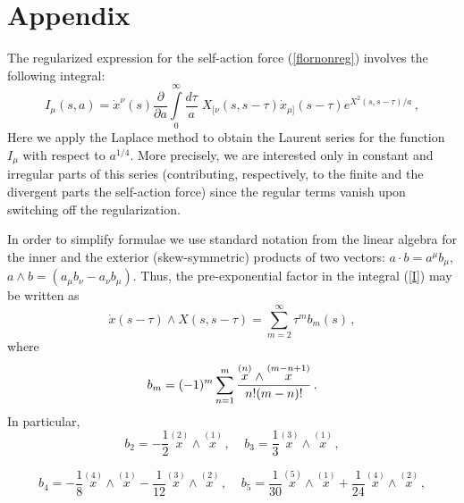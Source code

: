 \documentclass[a4paper,12pt]{article}
\begin{document}
\section*{Appendix}

The regularized expression for the self-action force
(\ref{flornonreg}) involves the following integral:
\begin{equation}\label{I}
I_{\mu}(s,a)=\dot{x}^\nu(s)\frac{\partial}{\partial
a}\int\limits_0^\infty \frac{d\tau}{a}\;
X_{[\nu}(s,s-\tau)\dot{x}_{\mu] }(s-\tau ){ e^{X^2(s,s-\tau)/a}}
\,,
\end{equation}
Here we apply the Laplace method to obtain the Laurent series for
the function $I_{\mu}$ with respect to $a^{1/4}$. More precisely,
we are interested only in  constant and  irregular
 parts of this series (contributing, respectively, to the
finite and the divergent parts the self-action force) since the
regular terms vanish upon switching off the regularization.

In order to simplify formulae we use standard notation from the
linear algebra for the inner and the exterior (skew-symmetric)
products of two vectors: $a\cdot b=a^\mu b_\mu$, $a\wedge b=(a_\mu
b_\nu-a_\nu b_\mu)$. Thus, the pre-exponential  factor in the
integral (\ref{I}) may be written as
\begin{equation}\label{b}
\dot x(s-\tau)\wedge X(s,s-\tau)=\sum_{m=2}^{\infty}\tau^m
b_m(s)\,,
\end{equation}
where
$$
b_m=(-1)^m\sum_{n=1}^m\frac{\stackrel{(n)}{x}\wedge \stackrel{(m-n+1)}{x}}{%
n!(m-n)!}\,.
$$
In particular,
$$
b_2=-\frac12 \stackrel{(2)}{x}\wedge \stackrel{(1)}{x}\,,\;\;\;\;
b_3=\frac 13\stackrel{(3)}{x}\wedge \stackrel{(1)}{x}\,,
$$

$$
b_4=-\frac 18\stackrel{(4)}{x}\wedge
\stackrel{(1)}{x}-\frac 1{12}\stackrel{(3)}{x}\wedge
\stackrel{(2)}{x}\,,\;\;\;\; b_5=\frac
1{30}\stackrel{(5)}{x}\wedge \stackrel{(1)}{x}+\frac 1{24}
\stackrel{(4)}{x}\wedge \stackrel{(2)}{x}\,,
$$
\end{document}
